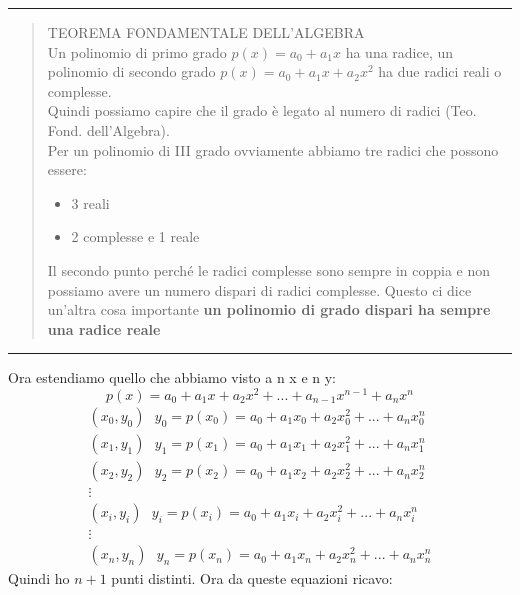 \documentclass[a4paper, portrait]{book}
\numberwithin{equation}{chapter} %
\newcommand*\sepline{%
  \begin{center}
    \rule[1ex]{.5\textwidth}{.5pt}
  \end{center}}
\begin{document}
\sepline
\begin{quotation}
TEOREMA FONDAMENTALE DELL'ALGEBRA\\
Un polinomio di primo grado $p(x) = a_0 + a_1 x$ ha una radice, un polinomio di secondo grado $p(x) = a_0 + a_1 x + a_2 x^2$ ha due radici reali o complesse.\\
Quindi possiamo capire che il grado è legato al numero di radici (Teo. Fond. dell'Algebra).\\
Per un polinomio di III grado ovviamente abbiamo tre radici che possono essere:
\begin{itemize}
    \item 3 reali
    \item 2 complesse e 1 reale
\end{itemize}
Il secondo punto perché le radici complesse sono sempre in coppia e non possiamo avere un numero dispari di radici complesse. Questo ci dice un'altra cosa importante \textbf{un polinomio di grado dispari ha sempre una radice reale}
\end{quotation}
\sepline
Ora estendiamo quello che abbiamo visto a n x e n y:
\begin{equation}
    p(x) = a_0 + a_1 x + a_2 x^2 + ... + a_{n-1}x^{n-1} + a_n x^n
\end{equation}
\begin{gather*}
    (x_0,y_0) \ \ \ y_0 = p(x_0) = a_0 + a_1 x_0 + a_2 x_0^2 + ... + a_n x_0^n\\
    (x_1,y_1) \ \ \ y_1 = p(x_1) = a_0 + a_1 x_1 + a_2 x_1^2 + ... + a_n x_1^n\\
    (x_2, y_2) \ \ \ y_2 = p(x_2) = a_0 + a_1 x_2 + a_2 x_2^2 + ... + a_n x_2^n\\
    \vdots\\
    (x_i, y_i) \ \ \ y_i = p(x_i) = a_0 + a_1 x_i + a_2 x_i^2 + ... + a_n x_i^n\\
    \vdots \\
    (x_n, y_n) \ \ \ y_n = p(x_n) = a_0 + a_1 x_n + a_2 x_n^2 + ... + a_n x_n^n
\end{gather*}
Quindi ho $n+1$ punti distinti. Ora da queste equazioni ricavo:
\end{document}
